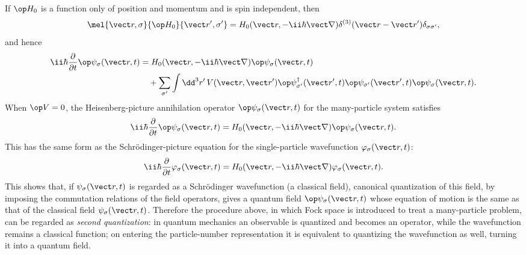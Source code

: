 If $\op H_0$ is a function only of position and momentum and is spin independent, then
\[\mel{\vect r,\sigma}{\op H_0}{\vect r',\sigma'}
=H_0(\vect r,-\ii\hbar\vect\nabla)
\delta^{(3)}(\vect r-\vect r')\delta_{\sigma\sigma'},\]
and hence
\begin{align*}
\ii\hbar\frac{\partial}{\partial t}\op\psi_\sigma(\vect r,t)
&=H_0(\vect r,-\ii\hbar\vect\nabla)\op\psi_\sigma(\vect r,t)\\
&\quad+\sum_{\sigma'}\int\dd^3r'\,
V(\vect r,\vect r')
\op\psi_{\sigma'}^\dagger(\vect r',t)
\op\psi_{\sigma'}(\vect r',t)
\op\psi_\sigma(\vect r,t).
\end{align*}
When $\op V=0$, the Heisenberg-picture annihilation operator $\op\psi_\sigma(\vect r,t)$ for the many-particle system satisfies
\[\ii\hbar\frac{\partial}{\partial t}\op\psi_\sigma(\vect r,t)
=H_0(\vect r,-\ii\hbar\vect\nabla)\op\psi_\sigma(\vect r,t).\]
This has the same form as the Schr\"odinger-picture equation for the single-particle wavefunction $\varphi_\sigma(\vect r,t)$:
\[\ii\hbar\frac{\partial}{\partial t}\varphi_\sigma(\vect r,t)
=H_0(\vect r,-\ii\hbar\vect\nabla)\varphi_\sigma(\vect r,t).\]
This shows that, if $\psi_\sigma(\vect r,t)$ is regarded as a Schr\"odinger wavefunction (a classical field), canonical quantization of this field, by imposing the commutation relations of the field operators, gives a quantum field $\op\psi_\sigma(\vect r,t)$ whose equation of motion is the same as that of the classical field $\psi_\sigma(\vect r,t)$. Therefore the procedure above, in which Fock space is introduced to treat a many-particle problem, can be regarded as \emph{second quantization}: in quantum mechanics an observable is quantized and becomes an operator, while the wavefunction remains a classical function; on entering the particle-number representation it is equivalent to quantizing the wavefunction as well, turning it into a quantum field.